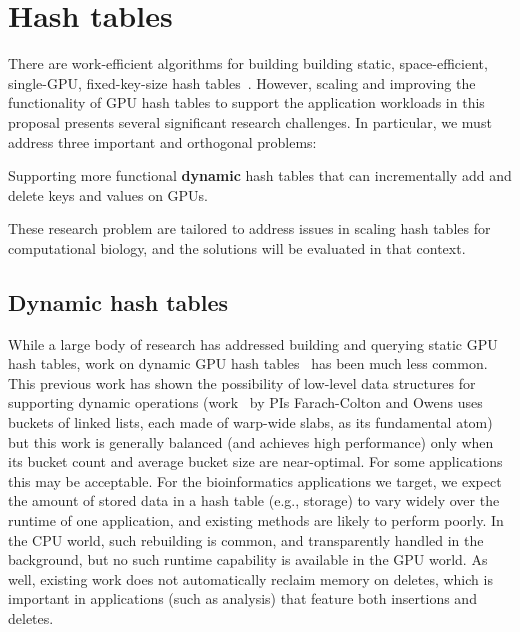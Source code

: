
\section{Hash tables}
\label{sec:hash-tables}

There are work-efficient algorithms for building building static, space-efficient, single-GPU, fixed-key-size hash tables~\cite{Awad:2023:AAI}.  However, scaling and improving the functionality of GPU hash tables to support the application workloads in this proposal presents several significant research challenges. In particular, we must address three important and orthogonal problems:


\begin{rproblem}
  Supporting more functional \textbf{dynamic} hash tables that can incrementally add and delete keys and values on GPUs.
  \label{rprob:dynamic-gpu-hashtable}
\end{rproblem}


These research problem are tailored to address issues in scaling hash tables for computational biology, and the solutions will be evaluated in that context.

\subsection{Dynamic hash tables}

While a large body of research has addressed building and querying static GPU hash tables, work on dynamic GPU hash tables~\cite{Ashkiani:2018:ADH,Junger:2020:WAL,Li:2021:DDH,Zhou:2021:DAD} has been much less common. This previous work has shown the possibility of low-level data structures for supporting dynamic operations (work~\cite{Ashkiani:2018:ADH} by PIs Farach-Colton and Owens uses buckets of linked lists, each made of warp-wide slabs, as its fundamental atom) but this work is generally balanced (and achieves high performance) only when its bucket count and average bucket size are near-optimal. For some applications this may be acceptable. For the bioinformatics applications we target, we expect the amount of stored data in a hash table (e.g., \kmer storage) to vary widely over the runtime of one application, and existing methods are likely to perform poorly. In the CPU world, such rebuilding is common, and transparently handled in the background, but no such runtime capability is available in the GPU world. As well, existing work does not automatically reclaim memory on deletes, which is important in applications (such as \kmer analysis) that feature both insertions and deletes.




